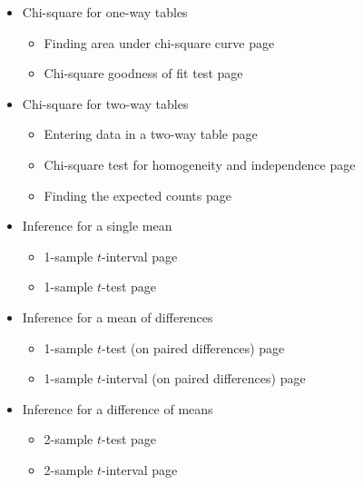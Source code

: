 \begin{itemize}
\item[] Chi-square for one-way tables
\begin{itemize}\vspace{-1mm}
\setlength{\itemsep}{0mm}
\item[] Finding area under chi-square curve \hfill page~\pageref{chisqtail}
\item[] Chi-square goodness of fit test \hfill page~\pageref{GOF}
\end{itemize}


\item[]  Chi-square for two-way tables
\begin{itemize}\vspace{-1mm}
\setlength{\itemsep}{0mm}
\item[] Entering data in a two-way table \hfill page~\pageref{2waytable}
\item[] Chi-square test for homogeneity and independence  \hfill page~\pageref{chisq2waytest}
\item[] Finding the expected counts  \hfill page~\pageref{expectedcounts}
\end{itemize}

\item[]  Inference for a single mean
\begin{itemize}\vspace{-1mm}
\setlength{\itemsep}{0mm}
\item[] 1-sample $t$-interval \hfill page~\pageref{1SampTint}
\item[] 1-sample $t$-test  \hfill page~\pageref{1SampTtest}
\end{itemize}



\item[] Inference for a mean of differences
\begin{itemize}\vspace{-1mm}
\setlength{\itemsep}{0mm}
\item[] 1-sample $t$-test (on paired differences) \hfill page~\pageref{matchedpairsttest}
\item[] 1-sample $t$-interval (on paired differences)  \hfill page~\pageref{matchedpairstint}
\end{itemize}


\item[] Inference for a difference of means 
\begin{itemize}\vspace{-1mm}
\setlength{\itemsep}{0mm}
\item[] 2-sample $t$-test  \hfill page~\pageref{2SampTtest}
\item[] 2-sample $t$-interval \hfill page~\pageref{2SampTint}
\end{itemize}



\end{itemize}
